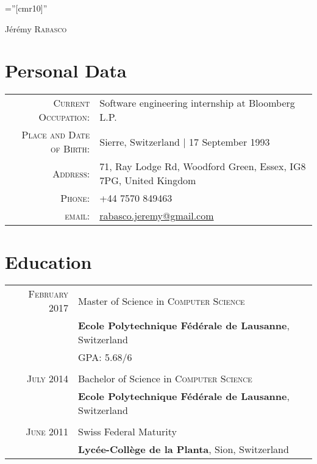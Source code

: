 \documentclass[a4paper,10pt]{article}
\begin{document}
\pagestyle{empty}
\font\fb=''[cmr10]''

\par{\centering
		{\Huge Jérémy \textsc{Rabasco}
	}\bigskip\par}

\section{Personal Data}

\begin{tabular}{rl}
	\textsc{Current Occupation:} & Software engineering internship at Bloomberg L.P.\\
	\textsc{Place and Date of Birth:} & Sierre, Switzerland | 17 September 1993 \\
	\textsc{Address:}   & 71, Ray Lodge Rd, Woodford Green, Essex, IG8 7PG, United Kingdom \\
	\textsc{Phone:}     & +44 7570 849463\\
	\textsc{email:}     & \href{mailto:rabasco.jeremy@gmail.com}{rabasco.jeremy@gmail.com}
\end{tabular}

\section{Education}
\begin{tabular}{rl}	
	\textsc{February 2017} & Master of Science in \textsc{Computer Science} \\
	& \textbf{Ecole Polytechnique Fédérale de Lausanne}, Switzerland\\
	&\normalsize \textsc{GPA}: 5.68/6\\\\
	\textsc{July} 2014 & Bachelor of Science in \textsc{Computer Science}\\
	& \textbf{Ecole Polytechnique Fédérale de Lausanne}, Switzerland\\\\
	\textsc{June 2011} & Swiss Federal Maturity\\
	&\textbf{Lycée-Collège de la Planta}, Sion, Switzerland
\end{tabular}

\end{document}
